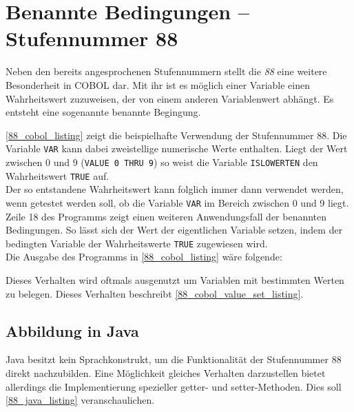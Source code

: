 \section{Benannte Bedingungen -- Stufennummer 88}
Neben den bereits angesprochenen Stufennummern stellt die \textit{88} eine weitere Besonderheit in COBOL dar. Mit ihr ist es möglich einer Variable einen Wahrheitswert zuzuweisen, der von einem anderen Variablenwert abhängt. Es entsteht eine sogenannte benannte Begingung.\\


\autoref{88_cobol_listing} zeigt die beispielhafte Verwendung der Stufennummer 88. Die Variable \texttt{VAR} kann dabei zweistellige numerische Werte enthalten. Liegt der Wert zwischen 0 und 9 (\texttt{VALUE 0 THRU 9}) so weist die Variable \texttt{ISLOWERTEN} den Wahrheitswert \texttt{TRUE} auf.\\

Der so entstandene Wahrheitswert kann folglich immer dann verwendet werden, wenn getestet werden soll, ob die Variable \texttt{VAR} im Bereich zwischen 0 und 9 liegt.\\

Zeile 18 des Programms zeigt einen weiteren Anwendungsfall der benannten Bedingungen. So lässt sich der Wert der eigentlichen Variable setzen, indem der bedingten Variable der Wahrheitswerte \texttt{TRUE} zugewiesen wird.\\

Die Ausgabe des Programms in \autoref{88_cobol_listing} wäre folgende:

Dieses Verhalten wird oftmals ausgenutzt um Variablen mit bestimmten Werten zu belegen. Dieses Verhalten beschreibt \autoref{88_cobol_value_set_listing}.\\


\subsection*{Abbildung in Java}
Java besitzt kein Sprachkonstrukt, um die Funktionalität der Stufennummer 88 direkt nachzubilden. Eine Möglichkeit gleiches Verhalten darzustellen bietet allerdings die Implementierung spezieller getter- und setter-Methoden. Dies soll \autoref{88_java_listing} veranschaulichen.\\

